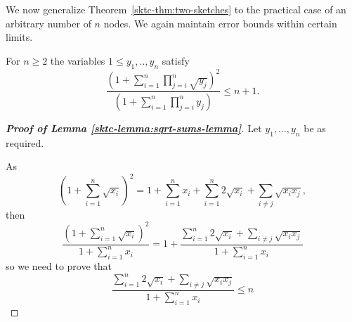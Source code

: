 We now generalize Theorem~\ref{sktc-thm:two-sketches} to the practical case of an arbitrary number of $n$ nodes.
We again maintain error bounds within certain limits.
\begin{lemma}
For $n \geq 2$ the variables $1 \leq y_1,..,y_n$ satisfy 
\[\textstyle \frac{\left(1+\sum\limits_{i=1}^n \prod\limits_{j=i}^n \sqrt{y_j}\right)^2}{
\left(1+\sum\limits_{i=1}^n \prod\limits_{j=i}^n y_j\right)}
\leq n+1.\]
\label{sktc-lemma:sqrt-sums-lemma}
\end{lemma}
\begin{proof}[\textbf{Proof of Lemma \ref{sktc-lemma:sqrt-sums-lemma}}]
Let $y_1,\dots,y_n$ be as required.

As \[\left(1+\sum\limits_{i=1}^n \sqrt{x_i}\right)^2 = 1+\sum\limits_{i=1}^n x_i+\sum\limits_{i=1}^n 2\sqrt{x_i} + \sum\limits_{i\neq j} \sqrt{x_ix_j},\]
then
\[\frac{\left(1+\sum\limits_{i=1}^n \sqrt{x_i}\right)^2}{1+\sum\limits_{i=1}^n x_i} = 1+ \frac{\sum\limits_{i=1}^n 2\sqrt{x_i} + \sum\limits_{i\neq j} \sqrt{x_ix_j}}{1+\sum\limits_{i=1}^n x_i}\]
so we need to prove that
\[\frac{\sum\limits_{i=1}^n 2\sqrt{x_i} + \sum\limits_{i\neq j} \sqrt{x_ix_j}}{1+\sum\limits_{i=1}^n x_i} \leq n\]

\end{proof}

